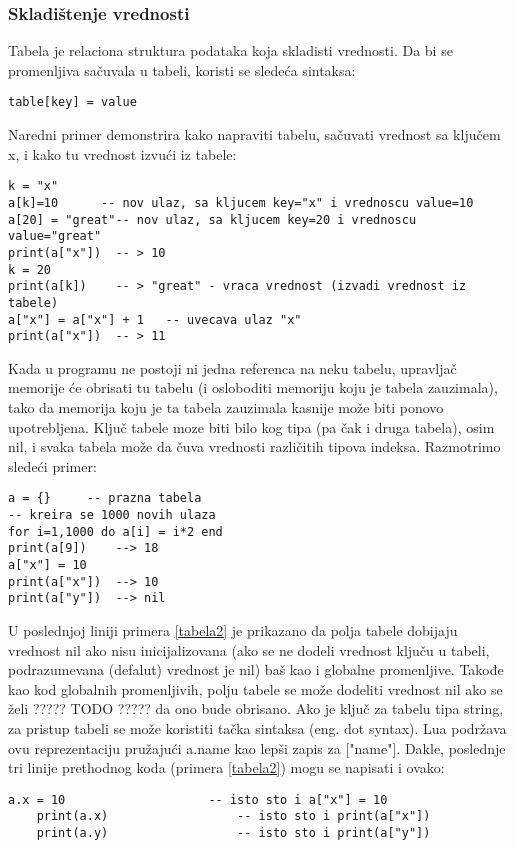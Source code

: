 \documentclass[a4paper]{article}
\begin{document}
\subsubsection*{Skladištenje vrednosti}
Tabela je relaciona struktura podataka koja skladisti vrednosti. Da bi se promenljiva sačuvala u tabeli, koristi se sledeća sintaksa:
\begin{verbatim}
table[key] = value
\end{verbatim}
Naredni primer demonstrira kako napraviti tabelu, sačuvati vrednost sa ključem x, i kako tu vrednost izvući iz tabele:
\begin{lstlisting}[caption={Primer čuvanja vrednosti u tabeli},frame=single, label=tabela1]
k = "x"
a[k]=10      -- nov ulaz, sa kljucem key="x" i vrednoscu value=10
a[20] = "great"-- nov ulaz, sa kljucem key=20 i vrednoscu value="great"
print(a["x"])  -- > 10
k = 20
print(a[k])    -- > "great"	- vraca vrednost (izvadi vrednost iz tabele)
a["x"] = a["x"] + 1   -- uvecava ulaz "x"
print(a["x"])  -- > 11
\end{lstlisting}
Kada u programu ne postoji ni jedna referenca na neku tabelu, upravljač memorije će obrisati tu tabelu (i osloboditi memoriju koju je tabela zauzimala), tako da memorija koju je ta tabela zauzimala kasnije može biti ponovo upotrebljena.
Ključ tabele moze biti bilo kog tipa (pa čak i druga tabela), osim nil, i svaka tabela može da čuva vrednosti različitih tipova indeksa. Razmotrimo sledeći primer:
\begin{lstlisting}[caption={Primer čuvanja vrednosti u tabeli},frame=single, label=tabela2]
a = {}     -- prazna tabela
-- kreira se 1000 novih ulaza
for i=1,1000 do a[i] = i*2 end
print(a[9])    --> 18
a["x"] = 10
print(a["x"])  --> 10
print(a["y"])  --> nil
\end{lstlisting}
U poslednjoj liniji primera \ref{tabela2} je prikazano da polja tabele dobijaju vrednost nil ako nisu inicijalizovana (ako se ne dodeli vrednost ključu u tabeli, podrazumevana (defalut) vrednost je nil) baš kao i globalne promenljive. Takođe kao kod globalnih promenljivih, polju tabele se može dodeliti vrednost nil ako se želi ????? TODO ????? da ono bude obrisano.
Ako je ključ za tabelu tipa string, za pristup tabeli se može koristiti tačka sintaksa (eng. dot syntax). Lua podržava ovu reprezentaciju pružajući a.name kao lepši zapis za ["name"]. Dakle, poslednje tri linije prethodnog koda (primera \ref{tabela2}) mogu se napisati i ovako:
\begin{lstlisting}[caption={Primer čuvanja vrednosti u tabeli},frame=single, label=tabela3]
    a.x = 10                    -- isto sto i a["x"] = 10
    print(a.x)                  -- isto sto i print(a["x"])
    print(a.y)                  -- isto sto i print(a["y"])
\end{lstlisting}
\end{document}

